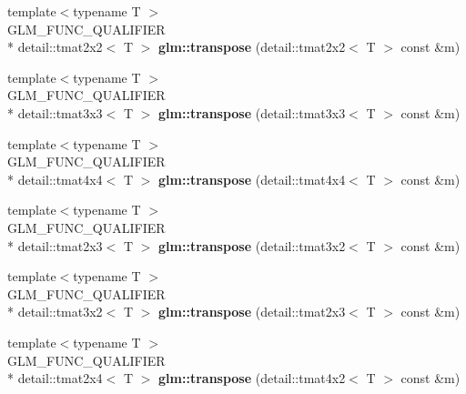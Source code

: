 \begin{DoxyCompactItemize}
\item 
\hypertarget{namespaceglm_a5c06983680df715f2ca2ade44551d8cd}{{\footnotesize template$<$typename T $>$ }\\G\-L\-M\-\_\-\-F\-U\-N\-C\-\_\-\-Q\-U\-A\-L\-I\-F\-I\-E\-R \\*
detail\-::tmat2x2$<$ T $>$ {\bfseries glm\-::transpose} (detail\-::tmat2x2$<$ T $>$ const \&m)}\label{namespaceglm_a5c06983680df715f2ca2ade44551d8cd}

\item 
\hypertarget{namespaceglm_a98952332d8165d133ab5122f2ffaf428}{{\footnotesize template$<$typename T $>$ }\\G\-L\-M\-\_\-\-F\-U\-N\-C\-\_\-\-Q\-U\-A\-L\-I\-F\-I\-E\-R \\*
detail\-::tmat3x3$<$ T $>$ {\bfseries glm\-::transpose} (detail\-::tmat3x3$<$ T $>$ const \&m)}\label{namespaceglm_a98952332d8165d133ab5122f2ffaf428}

\item 
\hypertarget{namespaceglm_ab9ab40d606cce96e1170448437cb6f74}{{\footnotesize template$<$typename T $>$ }\\G\-L\-M\-\_\-\-F\-U\-N\-C\-\_\-\-Q\-U\-A\-L\-I\-F\-I\-E\-R \\*
detail\-::tmat4x4$<$ T $>$ {\bfseries glm\-::transpose} (detail\-::tmat4x4$<$ T $>$ const \&m)}\label{namespaceglm_ab9ab40d606cce96e1170448437cb6f74}

\item 
\hypertarget{namespaceglm_a45c436155979bc13e854fb1c2aa7469b}{{\footnotesize template$<$typename T $>$ }\\G\-L\-M\-\_\-\-F\-U\-N\-C\-\_\-\-Q\-U\-A\-L\-I\-F\-I\-E\-R \\*
detail\-::tmat2x3$<$ T $>$ {\bfseries glm\-::transpose} (detail\-::tmat3x2$<$ T $>$ const \&m)}\label{namespaceglm_a45c436155979bc13e854fb1c2aa7469b}

\item 
\hypertarget{namespaceglm_a4313124a0d33b556ab63305ca7e0911f}{{\footnotesize template$<$typename T $>$ }\\G\-L\-M\-\_\-\-F\-U\-N\-C\-\_\-\-Q\-U\-A\-L\-I\-F\-I\-E\-R \\*
detail\-::tmat3x2$<$ T $>$ {\bfseries glm\-::transpose} (detail\-::tmat2x3$<$ T $>$ const \&m)}\label{namespaceglm_a4313124a0d33b556ab63305ca7e0911f}

\item 
\hypertarget{namespaceglm_aed2ebe1b1aea15e43bad09005b29fb8a}{{\footnotesize template$<$typename T $>$ }\\G\-L\-M\-\_\-\-F\-U\-N\-C\-\_\-\-Q\-U\-A\-L\-I\-F\-I\-E\-R \\*
detail\-::tmat2x4$<$ T $>$ {\bfseries glm\-::transpose} (detail\-::tmat4x2$<$ T $>$ const \&m)}\label{namespaceglm_aed2ebe1b1aea15e43bad09005b29fb8a}


\end{DoxyCompactItemize}
